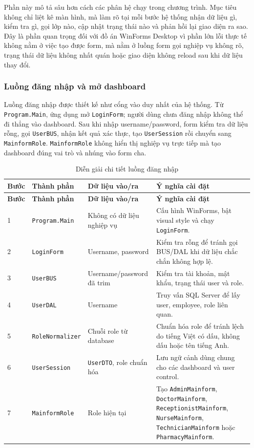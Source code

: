 \documentclass[12pt,a4paper]{article}
\numberwithin{figure}{subsection}
\numberwithin{table}{subsection}
\begin{document}
Phần này mô tả sâu hơn cách các phân hệ chạy trong chương trình. Mục tiêu không chỉ liệt kê màn hình, mà làm rõ tại mỗi bước hệ thống nhận dữ liệu gì, kiểm tra gì, gọi lớp nào, cập nhật trạng thái nào và phản hồi lại giao diện ra sao. Đây là phần quan trọng đối với đồ án WinForms Desktop vì phần lớn lỗi thực tế không nằm ở việc tạo được form, mà nằm ở luồng form gọi nghiệp vụ không rõ, trạng thái dữ liệu không nhất quán hoặc giao diện không reload sau khi dữ liệu thay đổi.

\subsubsection{Luồng đăng nhập và mở dashboard}

Luồng đăng nhập được thiết kế như cổng vào duy nhất của hệ thống. Từ \texttt{Program.Main}, ứng dụng mở \texttt{LoginForm}; người dùng chưa đăng nhập không thể đi thẳng vào dashboard. Sau khi nhập username/password, form kiểm tra dữ liệu rỗng, gọi \texttt{UserBUS}, nhận kết quả xác thực, tạo \texttt{UserSession} rồi chuyển sang \texttt{MainformRole}. \texttt{MainformRole} không hiển thị nghiệp vụ trực tiếp mà tạo dashboard đúng vai trò và nhúng vào form cha.

\begin{longtable}{|p{1.2cm}|p{3.8cm}|p{4.4cm}|p{5.2cm}|}
\caption{Diễn giải chi tiết luồng đăng nhập} \\
\hline
\textbf{Bước} & \textbf{Thành phần} & \textbf{Dữ liệu vào/ra} & \textbf{Ý nghĩa cài đặt} \\
\hline
\endfirsthead
\hline
\textbf{Bước} & \textbf{Thành phần} & \textbf{Dữ liệu vào/ra} & \textbf{Ý nghĩa cài đặt} \\
\hline
\endhead
1 & \texttt{Program.Main} & Không có dữ liệu nghiệp vụ & Cấu hình WinForms, bật visual style và chạy \texttt{LoginForm}. \\
\hline
2 & \texttt{LoginForm} & Username, password & Kiểm tra rỗng để tránh gọi BUS/DAL khi dữ liệu chắc chắn không hợp lệ. \\
\hline
3 & \texttt{UserBUS} & Username/password đã trim & Kiểm tra tài khoản, mật khẩu, trạng thái user và role. \\
\hline
4 & \texttt{UserDAL} & Username & Truy vấn SQL Server để lấy user, employee, role liên quan. \\
\hline
5 & \texttt{RoleNormalizer} & Chuỗi role từ database & Chuẩn hóa role để tránh lệch do tiếng Việt có dấu, không dấu hoặc tên tiếng Anh. \\
\hline
6 & \texttt{UserSession} & \texttt{UserDTO}, role chuẩn hóa & Lưu ngữ cảnh dùng chung cho các dashboard và user control. \\
\hline
7 & \texttt{MainformRole} & Role hiện tại & Tạo \texttt{AdminMainform}, \texttt{DoctorMainform}, \texttt{ReceptionistMainform}, \texttt{NurseMainform}, \texttt{TechnicianMainform} hoặc \texttt{PharmacyMainform}. \\
\hline
\end{longtable}
\end{document}
